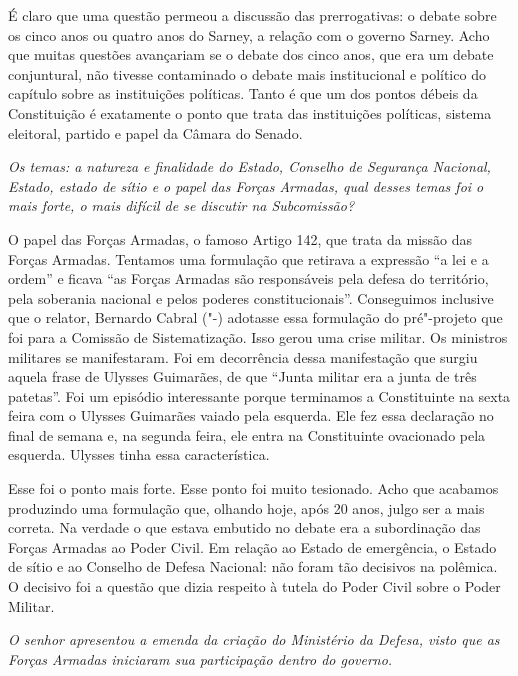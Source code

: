 É claro que uma questão permeou a discussão das prerrogativas: o debate
sobre os cinco anos ou quatro anos do Sarney, a relação com o governo
Sarney. Acho que muitas questões avançariam se o debate dos cinco anos,
que era um debate conjuntural, não tivesse contaminado o debate mais
institucional e político do capítulo sobre as instituições políticas.
Tanto é que um dos pontos débeis da Constituição é exatamente o ponto
que trata das instituições políticas, sistema eleitoral, partido e papel
da Câmara do Senado.

\medskip

\noindent\emph{Os temas: a natureza e finalidade do Estado, Conselho de
Segurança Nacional, Estado, estado de sítio e o papel das Forças
Armadas, qual desses temas foi o mais forte, o mais difícil de se
discutir na Subcomissão?}

O papel das Forças Armadas, o famoso Artigo 142, que
trata da missão das Forças Armadas. Tentamos uma formulação que retirava
a expressão ``a lei e a ordem'' e ficava ``as Forças Armadas são
responsáveis pela defesa do território, pela soberania nacional e pelos
poderes constitucionais''. Conseguimos inclusive que o relator, Bernardo
Cabral ("-) adotasse essa formulação do pré"-projeto que foi para a
Comissão de Sistematização. Isso gerou uma crise militar. Os ministros
militares se manifestaram. Foi em decorrência dessa manifestação que
surgiu aquela frase de Ulysses Guimarães, de que ``Junta militar era a
junta de três patetas''. Foi um episódio interessante porque terminamos
a Constituinte na sexta feira com o Ulysses Guimarães vaiado pela
esquerda. Ele fez essa declaração no final de semana e, na segunda
feira, ele entra na Constituinte ovacionado pela esquerda. Ulysses tinha
essa característica.

Esse foi o ponto mais forte. Esse ponto foi muito tesionado. Acho que
acabamos produzindo uma formulação que, olhando hoje, após 20 anos,
julgo ser a mais correta. Na verdade o que estava embutido no debate era
a subordinação das Forças Armadas ao Poder Civil. Em relação ao Estado
de emergência, o Estado de sítio e ao Conselho de Defesa Nacional: não
foram tão decisivos na polêmica. O decisivo foi a questão que dizia
respeito à tutela do Poder Civil sobre o Poder Militar.

\medskip

\noindent\emph{O senhor apresentou a emenda da criação do Ministério da Defesa,
visto que as Forças Armadas iniciaram sua participação dentro do
governo.}


